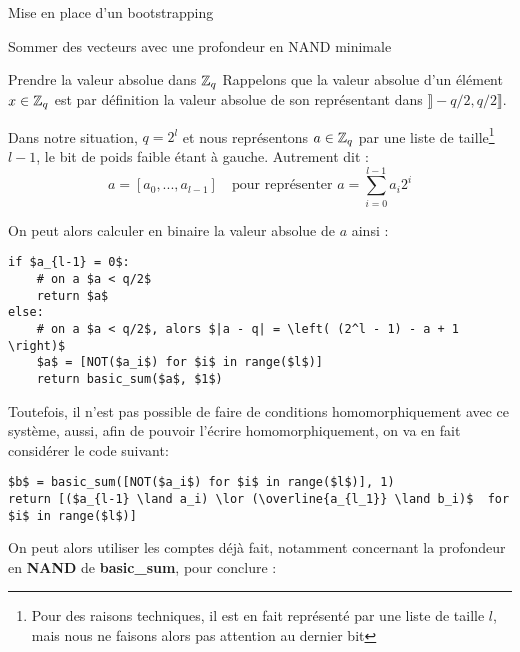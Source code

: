 \begin{section}{Mise en place d'un bootstrapping}
\begin{subsection}{Sommer des vecteurs avec une profondeur en NAND minimale}
\end{subsection}
\begin{subsection}{Prendre la valeur absolue dans $\mathbb{Z}_q$}
	Rappelons que la valeur absolue d'un élément $x\in \mathbb{Z}_q$ est par définition la valeur absolue de son représentant dans $\rrbracket -q/2, q/2\rrbracket$. 
	
	Dans notre situation, $q = 2^l$ et nous représentons $a\in \mathbb{Z}_q$ par une liste de taille\footnote{Pour des raisons techniques, il est en fait représenté par une liste de taille $l$, mais nous ne faisons alors pas attention au dernier bit} $l-1$, le bit de poids faible étant à gauche. Autrement dit :
\[ a = [a_0, ..., a_{l-1}] \quad \text{pour représenter } a = \sum_{i=0}^{l-1} a_i 2^i\]

	On peut alors calculer en binaire la valeur absolue de $a$ ainsi :

\vspace{0.5cm}
\begin{lstlisting}
if $a_{l-1} = 0$: 
	# on a $a < q/2$
	return $a$
else:
	# on a $a < q/2$, alors $|a - q| = \left( (2^l - 1) - a + 1 \right)$
	$a$ = [NOT($a_i$) for $i$ in range($l$)]
	return basic_sum($a$, $1$)
\end{lstlisting}

	Toutefois, il n'est pas possible de faire de conditions homomorphiquement avec ce système, aussi, afin de pouvoir l'écrire homomorphiquement, on va en fait considérer le code suivant:

\vspace{0.5cm}
\begin{lstlisting}
$b$ = basic_sum([NOT($a_i$) for $i$ in range($l$)], 1)
return [($a_{l-1} \land a_i) \lor (\overline{a_{l_1}} \land b_i)$  for $i$ in range($l$)]
\end{lstlisting}

	On peut alors utiliser les comptes déjà fait, notamment concernant la profondeur en \textbf{NAND} de \textbf{basic\_sum}, pour conclure :


\end{subsection}
\end{section}

